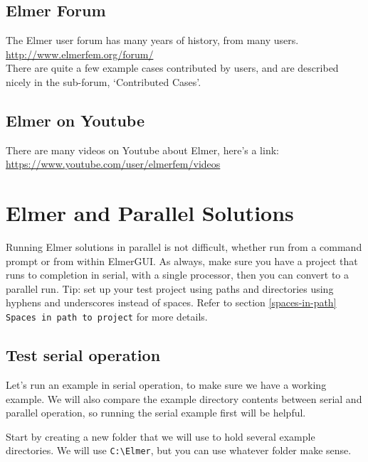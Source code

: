 \section{Elmer Forum}

The Elmer user forum has many years of history, from many users.\\

\url{http://www.elmerfem.org/forum/}\\

There are quite a few example cases contributed by users, and are described nicely in the sub-forum, `Contributed Cases'.

\section{Elmer on Youtube}

There are many videos on Youtube about Elmer, here's a link:\\

\url{https://www.youtube.com/user/elmerfem/videos}


\chapter{Elmer and Parallel Solutions}

Running Elmer solutions in parallel is not difficult, whether run from a command prompt or from within ElmerGUI.  As always, make sure you have a project that runs to completion in serial, with a single processor, then you can convert to a parallel run.  Tip: set up your test project using paths and directories using hyphens and underscores instead of spaces.  Refer to section  \ref{spaces-in-path} \texttt{Spaces in path to project} for more details.

\section{Test serial operation}

Let's run an example in serial operation, to make sure we have a working example.  We will also compare the example directory contents between serial and parallel operation, so running the serial example first will be helpful.

Start by creating a new folder that we will use to hold several example directories.  We will use \texttt{C:\textbackslash{}Elmer}, but you can use whatever folder make sense.

